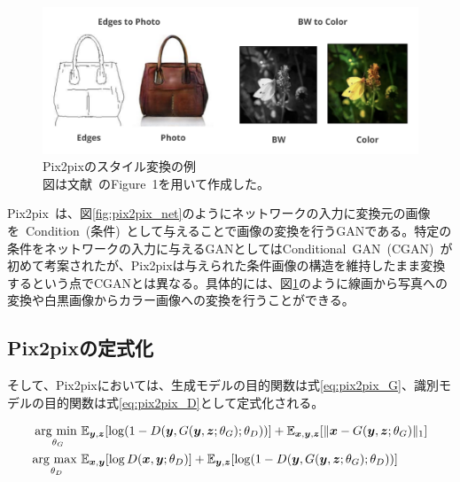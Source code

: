 \begin{figure}[t]
\begin{center}
\includegraphics[width=\hsize]{figure/pix2pix_img.png}
\caption{Pix2pixのスタイル変換の例\\
図は文献~\cite{pix2pix}のFigure~1を用いて作成した。}
\label{fig:pix2pix_img}
\end{center}
\end{figure}

Pix2pix~\cite{pix2pix}は、図\ref{fig:pix2pix_net}のようにネットワークの入力に変換元の画像を~Condition~(条件)~として与えることで画像の変換を行うGANである。特定の条件をネットワークの入力に与えるGANとしてはConditional~GAN~(CGAN)~\cite{CGAN}が初めて考案されたが、Pix2pixは与えられた条件画像の構造を維持したまま変換するという点でCGANとは異なる。具体的には、図\ref{fig:pix2pix_img}のように線画から写真への変換や白黒画像からカラー画像への変換を行うことができる。

\subsection{Pix2pixの定式化}

そして、Pix2pixにおいては、生成モデルの目的関数は式\ref{eq:pix2pix_G}、識別モデルの目的関数は式\ref{eq:pix2pix_D}として定式化される。

\begin{align}
    \label{eq:pix2pix_G}
    \mathop{\rm arg~min~}\limits _{\theta_G}& \mathbb{E}_{\boldsymbol{y}, \boldsymbol{z}}[\log (1-D(\boldsymbol{y}, G(\boldsymbol{y}, \boldsymbol{z}; \theta_G); \theta_D))]+\mathbb{E}_{\boldsymbol{x}, \boldsymbol{y}, \boldsymbol{z}}[\|\boldsymbol{x}-G(\boldsymbol{y}, \boldsymbol{z}; \theta_G)\|_{1}]\\
    \label{eq:pix2pix_D}
    \mathop{\rm arg~max~}\limits _{\theta_D}& \mathbb{E}_{\boldsymbol{x}, \boldsymbol{y}}[\log D(\boldsymbol{x}, \boldsymbol{y}; \theta_D)]+\mathbb{E}_{\boldsymbol{y}, \boldsymbol{z}}[\log (1-D(\boldsymbol{y}, G(\boldsymbol{y}, \boldsymbol{z}; \theta_G); \theta_D))]
\end{align}

